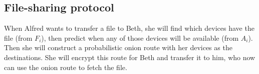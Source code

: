 \subsection{File-sharing protocol}

When Alfred wants to transfer a file to Beth, she will find which devices have the 
file (from \(F_i\)), then predict when any of those devices will be available 
(from \(A_i\)).
Then she will construct a probabilistic onion route with her devices as the 
destinations.
She will encrypt this route for Beth and transfer it to him, who now can use the 
onion route to fetch the file.
